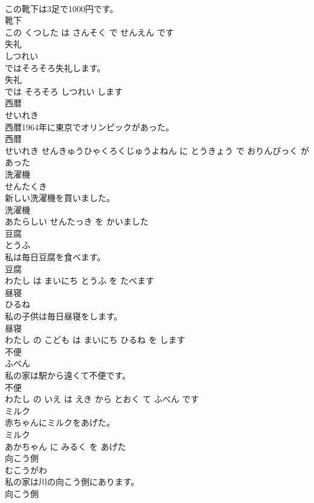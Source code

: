 \documentclass[8pt]{extreport}
\begin{document}
\begin{CJK}{UTF8}{min}
\\	この靴下は3足で1000円です。	
\\	靴下 
\\	この くつした は さんそく で せんえん です			
\\	失礼	
\\	しつれい			
\\	ではそろそろ失礼します。	
\\	失礼 
\\	では そろそろ しつれい します			
\\	西暦	
\\	せいれき			
\\	西暦1964年に東京でオリンピックがあった。	
\\	西暦 
\\	せいれき せんきゅうひゃくろくじゅうよねん に とうきょう で おりんぴっく が あった			
\\	洗濯機	
\\	せんたくき			
\\	新しい洗濯機を買いました。	
\\	洗濯機 
\\	あたらしい せんたっき を かいました			
\\	豆腐	
\\	とうふ			
\\	私は毎日豆腐を食べます。	
\\	豆腐 
\\	わたし は まいにち とうふ を たべます			
\\	昼寝	
\\	ひるね			
\\	私の子供は毎日昼寝をします。	
\\	昼寝 
\\	わたし の こども は まいにち ひるね を します			
\\	不便	
\\	ふべん			
\\	私の家は駅から遠くて不便です。	
\\	不便 
\\	わたし の いえ は えき から とおく て ふべん です			
\\	ミルク	
\\	赤ちゃんにミルクをあげた。	
\\	ミルク 
\\	あかちゃん に みるく を あげた			
\\	向こう側	
\\	むこうがわ			
\\	私の家は川の向こう側にあります。	
\\	向こう側 

\end{CJK}
\end{document}
